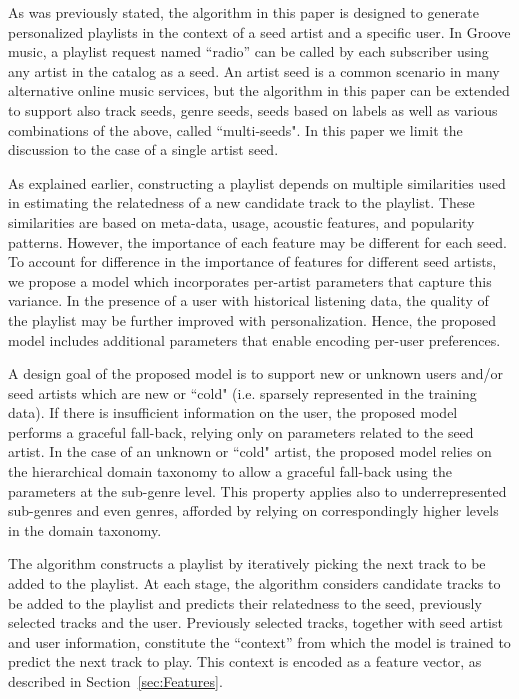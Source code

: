 \label{sec:OurModel}
As was previously stated, the algorithm in this paper is designed to generate personalized playlists in the context of a seed artist and a specific user. In Groove music, a playlist request named ``radio'' can be called by each subscriber using any artist in the catalog as a seed. An artist seed is a common scenario in many alternative online music services, but the algorithm in this paper can be extended to support also track seeds, genre seeds, seeds based on labels as well as various combinations of the above, called ``multi-seeds". In this paper we limit the discussion to the case of a single artist seed.

As explained earlier, constructing a playlist depends on multiple similarities used in estimating the relatedness of a new candidate track to the playlist. These similarities are based on meta-data, usage, acoustic features, and popularity patterns. 
However, the importance of each feature may be different for each seed. To account for difference in the importance of features for different seed artists, we propose a model which incorporates per-artist parameters that capture this variance. In the presence of a user with historical listening data, the quality of the playlist may be further improved with personalization. Hence, the proposed model includes additional parameters that enable encoding per-user preferences. 

A design goal of the proposed model is to support new or unknown users and/or seed artists which are new or ``cold" (i.e. sparsely represented in the training data). If there is insufficient information on the user, the proposed model performs a graceful fall-back, relying only on parameters related to the seed artist. In the case of an unknown or ``cold" artist, the proposed model relies on the hierarchical domain taxonomy to allow a graceful fall-back using the parameters at the sub-genre level. This property applies also to underrepresented sub-genres and even genres, afforded by relying on correspondingly higher levels in the domain taxonomy. 


The algorithm constructs a playlist by iteratively picking the next track to be added to the playlist. 
At each stage, the algorithm considers candidate tracks to be added to the playlist and predicts their relatedness to the seed, previously selected tracks and the user. 
Previously selected tracks, together with seed artist and user information, constitute the ``context'' from which the model is trained to predict the next track to play. This context is encoded as a feature vector, as described in Section~\ref{sec:Features}.  

